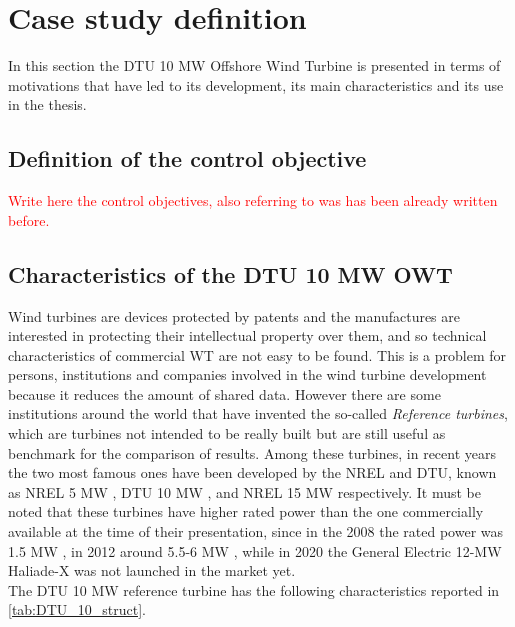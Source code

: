 \newpage
\section{Case study definition}\label{sec:c_10MW_OWT}
In this section the DTU 10 MW Offshore Wind Turbine is presented in terms of motivations that have led to its development, its main characteristics and its use in the thesis. 

\subsection{Definition of the control objective}
\textcolor{red}{Write here the control objectives, also referring to was has been already written before.}
\subsection{Characteristics of the DTU 10 MW OWT}
Wind turbines are devices protected by patents and the manufactures are interested in protecting their intellectual property over them, and so technical characteristics of commercial \acrshort{WT} are not easy to be found. This is a problem for persons, institutions and companies involved in the wind turbine development because it reduces the amount of shared data. However there are some institutions around the world that have invented the so-called \textit{Reference turbines}, which are turbines not intended to be really built but are still useful as benchmark for the comparison of results. Among these turbines, in recent years the two most famous ones have been developed by the \acrfull{NREL} and \acrfull{DTU}, known as NREL 5 MW \cite{NREL_5MW_reference}, DTU 10 MW \cite{DTU_Wind_Energy_Report-I-0092}, and NREL 15 MW \cite{NREL_15MW} respectively. It must be noted that these  turbines have higher rated power than the one commercially available at the time of their presentation, since in the 2008 the rated power was 1.5 MW \cite{Wind_Energy_Technology_Current_Status_and_RD_Futur}, in 2012 around 5.5-6 MW \cite{European_offshore_statistics_2012}, while in 2020 the General Electric 12-MW Haliade-X was not launched in the market yet. \\
The DTU 10 MW reference turbine has the following characteristics reported in \autoref{tab:DTU_10_struct}.
